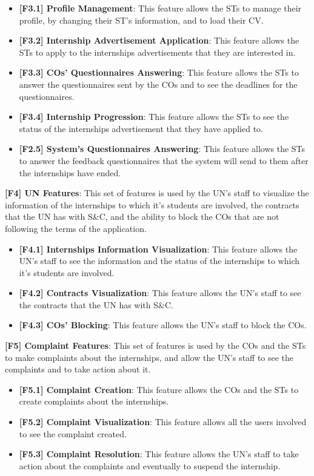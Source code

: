 \begin{itemize}
    \item \textbf{[F3.1] Profile Management}: This feature allows the STs to manage their profile, by changing their
    ST's information, and to load their CV.
    \item \textbf{[F3.2] Internship Advertisement Application}: This feature allows the STs to apply to the internships
    advertisements that they are interested in.
    \item \textbf{[F3.3] COs' Questionnaires Answering}: This feature allows the STs to answer the questionnaires sent by
    the COs and to see the deadlines for the questionnaires.
    \item \textbf{[F3.4] Internship Progression}: This feature allows the STs to see the status of the internships
    advertisement that they have applied to.
    \item \textbf{[F2.5] System's Questionnaires Answering}: This feature allows the STs to answer the feedback 
    questionnaires that the system will send to them after the internships have ended.
\end{itemize}

\par \textbf{[F4] UN Features}: This set of features is used by the UN's staff to visualize the information of the
internships to which it's students are involved, the contracts that the UN has with S\&C, and the ability to block the
COs that are not following the terms of the application.

\begin{itemize}
    \item \textbf{[F4.1] Internships Information Visualization}: This feature allows the UN's staff to see the
    information and the status of the internships to which it's students are involved.
    \item \textbf{[F4.2] Contracts Visualization}: This feature allows the UN's staff to see the contracts that the UN
    has with S\&C.
    \item \textbf{[F4.3] COs' Blocking}: This feature allows the UN's staff to block the COs.
\end{itemize}

\par \textbf{[F5] Complaint Features}: This set of features is used by the COs and the STs to make complaints about the
internships, and allow the UN's staff to see the complaints and to take action about it.

\begin{itemize}
    \item \textbf{[F5.1] Complaint Creation}: This feature allows the COs and the STs to create complaints about the
    internships.
    \item \textbf{[F5.2] Complaint Visualization}: This feature allows all the users involved to see the complaint 
    created.
    \item \textbf{[F5.3] Complaint Resolution}: This feature allows the UN's staff to take action about the complaints
    and eventually to suspend the internship.
\end{itemize}

